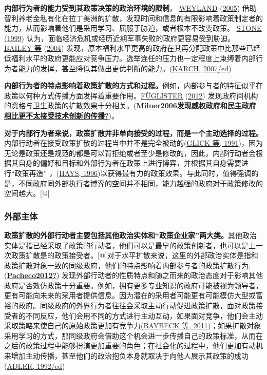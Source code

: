 \documentclass[
  12pt,
]{ctexart}
\begin{document}
\textbf{内部行为者的能力受到其政策决策的政治环境的限制}， \protect\hyperlink{ref-Weyland2005a}{WEYLAND} (\protect\hyperlink{ref-Weyland2005a}{2005}) 借助智利养老金私有化在拉丁美洲的扩散，发现时间和信息的有限影响着政策制定者的能力，从而影响着他们是采用学习、屈服于胁迫，或者根本不改变政策。 \protect\hyperlink{ref-Stone1999}{STONE} (\protect\hyperlink{ref-Stone1999}{1999}) 认为，面临经济危机或经历近期军事失败的政府更容易受到胁迫。 \protect\hyperlink{ref-BaileyRom2004}{BAILEY 等} (\protect\hyperlink{ref-BaileyRom2004}{2004}) 发现，原本福利水平更高的政府在其再分配政策中比那些已经低福利水平的政府更能应对竞争压力。选举连任的压力也一定程度上束缚着内部行为者能力的发挥，甚至降低其做出更优判断的能力。(\protect\hyperlink{ref-Karch2007a}{KARCH, 2007/ed})

\textbf{内部行为者的特点影响着政策扩散的方式和过程。}例如，内部参与者的特征似乎在政策以何种方式传播方面发挥着重要作用。\protect\hyperlink{ref-Fuglister2012}{FÜGLISTER} (\protect\hyperlink{ref-Fuglister2012}{2012}) 发现政府间机构的资格与卫生政策的扩散效果十分相关。(\protect\hyperlink{ref-Milner2006ux53d1ux73b0ux5a01ux6743ux653fux5e9cux548cux6c11ux4e3bux653fux5e9cux76f8ux6bd4ux66f4ux4e0dux592aux63a5ux53d7ux6280ux672fux521bux65b0ux7684ux4f20ux64ad}{\textbf{Milner2006发现威权政府和民主政府相比更不太接受技术创新的传播?}})。

\textbf{对于内部行为者来说，政策扩散并非单向接受的过程，而是一个主动选择的过程。}内部行动者在接受政策扩散的过程当中并不是完全被动的(\protect\hyperlink{ref-GlickHays1991}{GLICK 等, 1991})，因为无论是政策还是规范的都是可以背拒绝或者至少是修改的，因此，内部行动者会根据其自身的偏好和目标和外部行为者在政策上进行博弈，并根据其自身需要进行``政策再造'' ，(\protect\hyperlink{ref-Hays1996}{HAYS, 1996})以获得最有力的政策效果。与此同时，值得强调的是，不同政府同外部执行者博弈的空间并不相同，能力越强的政府对于政策修改的空间越大。{[}@{]}

\hypertarget{ux5916ux90e8ux4e3bux4f53}{%
\subsubsection{外部主体}\label{ux5916ux90e8ux4e3bux4f53}}

\textbf{政策扩散的外部行动者主要包括其他政治实体和``政策企业家''两大类。}其他政治实体是指已经采取了政策的行动者，他们可以是最早的政策创新者，也可以是上一次政策扩散是的政策接受者。{[}@{]}对于水平扩散来说，这里的外部政治实体是指和政策扩散对象一致的同级政府，他们的特点影响着内部参与者的政策扩散行为, (\protect\hyperlink{ref-Pacheco2012}{\textbf{Pacheco2012?}}) 发现外部行动者的性质特点和随之而来的政治态度对于影响其他政府是否效仿政策十分重要。例如，拥有更多专业知识的政府可能被视为领导者，更有可能向未来的采用者提供信息。因为潜在的采用者可能更有可能模仿大型或富裕的政府。同级政府的外界行为者往往会采取主动行动促进政策扩散，面对政策接受者的不同反应，他们会用不同的方式进行主动互动，如果面对竞争，他们会主动采取策略来使自己的原始政策更加有竞争力(\protect\hyperlink{ref-BaybeckEtAl2011}{BAYBECK 等, 2011})；如果扩散对象采用学习的方式，那同级政府会借助这个机会进一步传播自己的政策标准，从而在之后的政策过程中能够扮演更加重要的角色；在社会化的过程中，他们更加有动机来增加主动传播，甚至他们的政治抱负本身就取决于向他人展示其政策的成功(\protect\hyperlink{ref-Adler1992}{ADLER, 1992/ed})
\end{document}
